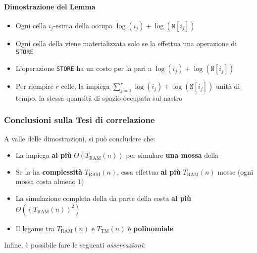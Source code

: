 \documentclass[italian, 10pt]{article}
\begin{document}

\paragraph{Dimostrazione del Lemma}

\begin{itemize}
  \item Ogni cella \(i_j\)-esima della \RAM occupa \(\log{(i_j)} + \log{(\texttt{N}[i_j])}\)
  \item Ogni cella della \RAM viene materializzata solo se la \RAM effettua una operazione di \texttt{STORE}
  \item L'operazione \texttt{STORE} ha un costo per la \RAM pari a \(\log{(i_j)} + \log{(\texttt{N}[i_j])}\)
  \item Per riempire \(r\) celle, la \RAM impiega \(\displaystyle \sum_{j=1}^{r} \log{(i_j)} + \log{(\texttt{N}[i_j])}\) unità di tempo, la stessa quantità di spazio occupata sul nastro
\end{itemize}

\subsubsection{Conclusioni sulla Tesi di correlazione}

A valle delle dimostrazioni, si può concludere che:

\begin{itemize}
  \item La \TM impiega \textbf{al più} \(\Theta(T_\text{RAM}(n))\) per simulare \textbf{una mossa} della \RAM
  \item Se la \RAM ha \textbf{complessità} \(T_\text{RAM}(n)\), essa effettua \textbf{al più} \(T_\text{RAM}(n)\) mosse (ogni mossa costa almeno \(1\))
  \item La simulazione completa della \RAM da parte della \TM costa \textbf{al più} \(\Theta\left((T_\text{RAM}(n))^2\right)\)
  \item Il legame tra \(T_\text{RAM}(n)\) e \(T_\text{TM}(n)\) è \textbf{polinomiale}
\end{itemize}

\bigskip
Infine, è possibile fare le seguenti \textit{osservazioni}:
\end{document}
